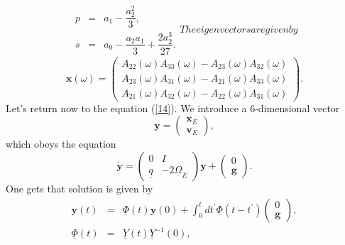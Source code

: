 \documentclass[twocolumn,showpacs,preprintnumbers]{revtex4}
\begin{document}
\begin{subequations}
\label{22}
\begin{eqnarray}
p &=&a_{1}-\dfrac{a_{2}^{2}}{3},  \label{22a} \\
s &=&a_{0}-\dfrac{a_{2}a_{1}}{3}+\dfrac{2a_{2}^{3}}{27}.  \label{22b}
\end{eqnarray}%
The eigenvectors are given by 
\end{subequations}
\begin{equation}
\mathbf{x}\left( \omega \right) =\left( 
\begin{array}{c}
A_{22}\left( \omega \right) A_{33}\left( \omega \right) -A_{23}\left( \omega
\right) A_{32}\left( \omega \right) \\ 
A_{23}\left( \omega \right) A_{31}\left( \omega \right) -A_{21}\left( \omega
\right) A_{33}\left( \omega \right) \\ 
A_{21}\left( \omega \right) A_{32}\left( \omega \right) -A_{22}\left( \omega
\right) A_{31}\left( \omega \right)%
\end{array}%
\right) .  \label{23}
\end{equation}%
Let's return now to the equation (\ref{14}). We introduce a 6-dimensional
vector%
\begin{equation}
\mathbf{y}=\left( 
\begin{array}{c}
\mathbf{x}_{E} \\ 
\mathbf{v}_{E}%
\end{array}%
\right) ,  \label{24}
\end{equation}%
which obeys the equation%
\begin{equation}
\mathbf{\dot{y}}=\left( 
\begin{array}{cc}
0 & I \\ 
\underline{q} & -2\underline{\Omega }_{E}%
\end{array}%
\right) \mathbf{y}+\left( 
\begin{array}{c}
0 \\ 
\mathbf{g}%
\end{array}%
\right) .  \label{25}
\end{equation}%
One gets that solution is given by%
\begin{eqnarray}
\mathbf{y}\left( t\right) &=&\underline{\Phi }\left( t\right) \mathbf{y}%
\left( 0\right) +\int_{0}^{t}dt^{\prime }\underline{\Phi }\left( t-t^{\prime
}\right) \left( 
\begin{array}{c}
0 \\ 
\mathbf{g}%
\end{array}%
\right) ,  \label{26a} \\
\underline{\Phi }\left( t\right) &=&\underline{Y}\left( t\right) \underline{Y%
}^{-1}\left( 0\right) ,  \label{26b}
\end{eqnarray}%
\end{document}
